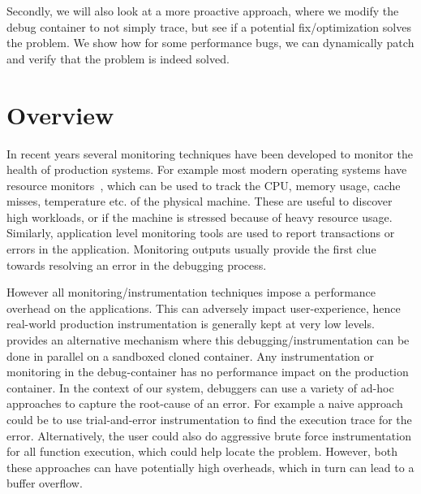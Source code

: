 Secondly, we will also look at a more proactive approach, where we modify the debug container to not simply trace, but see if a potential fix/optimization solves the problem.
We show how for some performance bugs, we can dynamically patch and verify that the problem is indeed solved.

\section{Overview}
\label{sec:overview}


In recent years several monitoring techniques have been developed to monitor the health of production systems.
For example most modern operating systems have resource monitors~\cite{linuxHealth, windowsHealth, macHealth}, which can be used to track the CPU, memory usage, cache misses, temperature etc. of the physical machine.
These are useful to discover high workloads, or if the machine is stressed because of heavy resource usage.
Similarly, application level monitoring tools are used to report transactions or errors in the application.
Monitoring outputs usually provide the first clue towards resolving an error in the debugging process.

However all monitoring/instrumentation techniques impose a performance overhead on the applications.
This can adversely impact user-experience, hence real-world production instrumentation is generally kept at very low levels.
\parikshan provides an alternative mechanism where this debugging/instrumentation can be done in parallel on a sandboxed cloned container.
Any instrumentation or monitoring in the debug-container has no performance impact on the production container.
In the context of our system, debuggers can use a variety of ad-hoc approaches to capture the root-cause of an error.
For example a naive approach could be to use trial-and-error instrumentation to find the execution trace for the error.
Alternatively, the user could also do aggressive brute force instrumentation for all function execution, which could help locate the problem.
However, both these approaches can have potentially high overheads, which in turn can lead to a buffer overflow.

